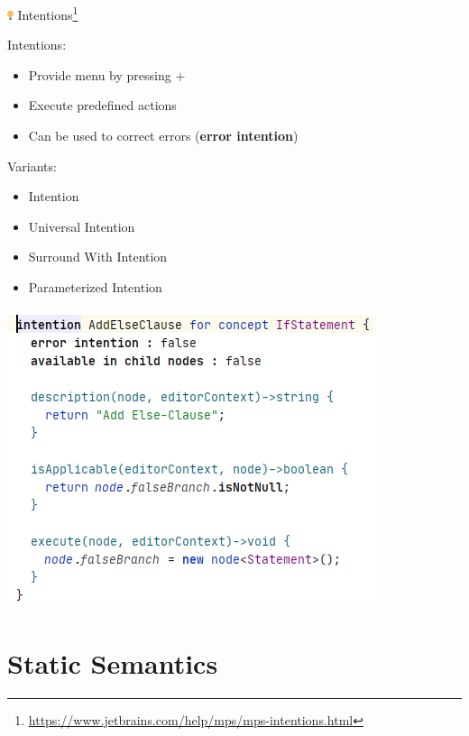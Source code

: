 	\begin{frame}{\includegraphics[height=0.25cm]{graphics/intentions.png} Intentions\footnote{\url{https://www.jetbrains.com/help/mps/mps-intentions.html}}}
		\begin{minipage}{0.52\textwidth}
			Intentions:
			\begin{itemize}
				\item Provide \menu{\workshopintention} menu by pressing +\menu{\return}
				\item Execute predefined actions
				\item Can be used to correct errors (\textbf{error intention})
			\end{itemize}
			Variants:
			\begin{itemize}
				\item Intention
				\item Universal Intention
				\item Surround With Intention
				\item Parameterized Intention
			\end{itemize}
		\end{minipage}
		\begin{minipage}{0.4\textwidth}
			\includegraphics[height=0.8\textheight]{illustrations/intention.png}
		\end{minipage}
	\end{frame}

	\section{Static Semantics}
	
